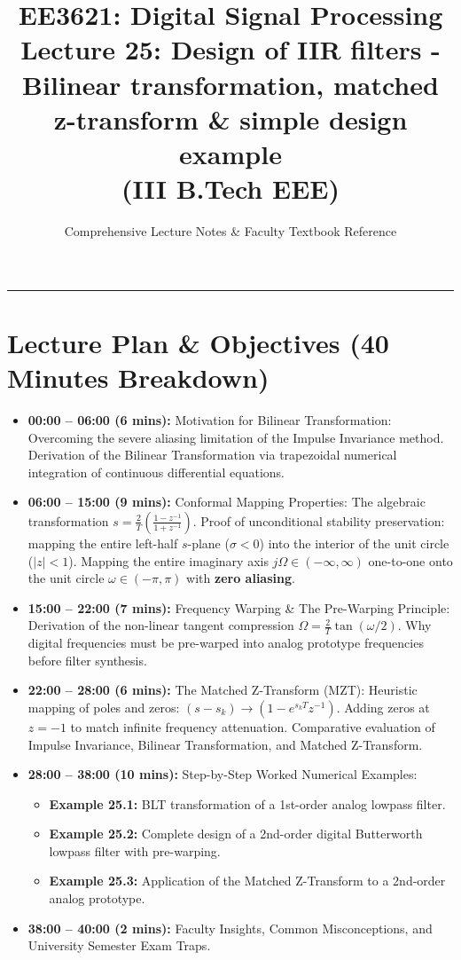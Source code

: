 \documentclass[11pt,a4paper]{article}
\title{\textbf{EE3621: Digital Signal Processing} \\ \Large Lecture 25: Design of IIR filters - Bilinear transformation, matched z-transform \& simple design example \\ \large (III B.Tech EEE)}
\author{Comprehensive Lecture Notes \& Faculty Textbook Reference}
\date{}
\begin{document}
\maketitle

\noindent\rule{\textwidth}{0.5pt}

\section*{Lecture Plan \& Objectives (40 Minutes Breakdown)}
\begin{itemize}
    \item \textbf{00:00 -- 06:00 (6 mins):} Motivation for Bilinear Transformation: Overcoming the severe aliasing limitation of the Impulse Invariance method. Derivation of the Bilinear Transformation via trapezoidal numerical integration of continuous differential equations.
    \item \textbf{06:00 -- 15:00 (9 mins):} Conformal Mapping Properties: The algebraic transformation $s = \frac{2}{T}\left(\frac{1 - z^{-1}}{1 + z^{-1}}\right)$. Proof of unconditional stability preservation: mapping the entire left-half $s$-plane ($\sigma < 0$) into the interior of the unit circle ($|z| < 1$). Mapping the entire imaginary axis $j\Omega \in (-\infty, \infty)$ one-to-one onto the unit circle $\omega \in (-\pi, \pi)$ with \textbf{zero aliasing}.
    \item \textbf{15:00 -- 22:00 (7 mins):} Frequency Warping \& The Pre-Warping Principle: Derivation of the non-linear tangent compression $\Omega = \frac{2}{T}\tan(\omega/2)$. Why digital frequencies must be pre-warped into analog prototype frequencies before filter synthesis.
    \item \textbf{22:00 -- 28:00 (6 mins):} The Matched Z-Transform (MZT): Heuristic mapping of poles and zeros: $(s - s_k) \to (1 - e^{s_k T} z^{-1})$. Adding zeros at $z = -1$ to match infinite frequency attenuation. Comparative evaluation of Impulse Invariance, Bilinear Transformation, and Matched Z-Transform.
    \item \textbf{28:00 -- 38:00 (10 mins):} Step-by-Step Worked Numerical Examples:
    \begin{itemize}
        \item \textbf{Example 25.1:} BLT transformation of a 1st-order analog lowpass filter.
        \item \textbf{Example 25.2:} Complete design of a 2nd-order digital Butterworth lowpass filter with pre-warping.
        \item \textbf{Example 25.3:} Application of the Matched Z-Transform to a 2nd-order analog prototype.
    \end{itemize}
    \item \textbf{38:00 -- 40:00 (2 mins):} Faculty Insights, Common Misconceptions, and University Semester Exam Traps.
\end{itemize}
\end{document}
